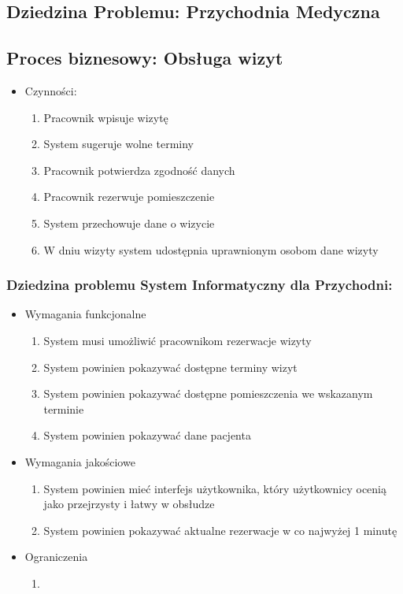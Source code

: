 \documentclass{article}
\begin{document}
\subsection*{Dziedzina Problemu: Przychodnia Medyczna}
\subsection*{Proces biznesowy: Obsługa wizyt}
\begin{itemize}
\item Czynności:
\begin{enumerate}
\item Pracownik wpisuje wizytę
\item System sugeruje wolne terminy
\item Pracownik potwierdza zgodność danych
\item Pracownik rezerwuje pomieszczenie
\item System przechowuje dane o wizycie
\item W dniu wizyty system udostępnia uprawnionym osobom dane wizyty
\end{enumerate}
\end{itemize}
\subsubsection*{Dziedzina problemu System Informatyczny dla Przychodni:}
\begin{itemize}
	\item Wymagania funkcjonalne
		\begin{enumerate}
			\item System musi umożliwić pracownikom rezerwacje wizyty
			\item System powinien pokazywać dostępne terminy wizyt
			\item System powinien pokazywać dostępne pomieszczenia we wskazanym terminie
			\item System powinien pokazywać dane pacjenta
		\end{enumerate}
	\item Wymagania jakościowe
		\begin{enumerate}
			\item System powinien mieć interfejs użytkownika, który użytkownicy ocenią jako przejrzysty i łatwy w obsłudze
			\item System powinien pokazywać aktualne rezerwacje w co najwyżej 1 minutę
		\end{enumerate}
	\item Ograniczenia
		\begin{enumerate}
			\item
		\end{enumerate}
\end{itemize}
\end{document}
